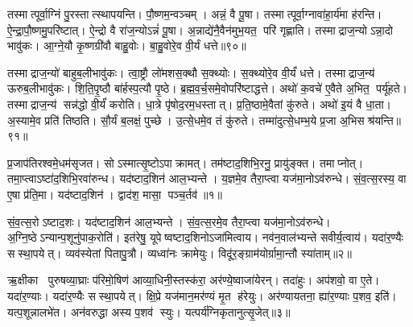 तस्मात्पूर्वा॒ग्निं पु॒रस्तात्स्थापयन्ति।
पौ॒ष्णम॒न्वञ्चम्।
अन्नं॒ वै पू॒षा।
तस्मात्पूर्वा॒ग्नावा॑हा॒र्य॑मा ह॑रन्ति।
ऐ॒न्द्रा॒पौ॒ष्णमु॒परि॑ष्टात्।
ऐ॒न्द्रो वै रा॑ज॒न्योऽन्नं॑ पू॒षा।
अ॒न्नाद्ये॑नै॒वैन॑मुभ॒यत॒ परि॑ गृह्णाति।
तस्माद्राज॒न्योऽन्ना॒दो भावु॑कः।
आ॒ग्ने॒यौ कृ॒ष्णग्री॑वौ बाहु॒वोः।
बा॒हु॒वोरे॒व वी॒र्यं धत्ते॥९०॥

तस्माद्राज॒न्यो॑ बाहुब॒लीभावु॑कः।
त्वा॒ष्ट्रौ लो॑मशस॒क्थौ स॒क्थ्योः।
स॒क्थ्योरे॒व वी॒र्यं॑ धत्ते।
तस्माद्राज॒न्य॑ ऊरुब॒लीभावु॑कः।
शि॒ति॒पृ॒ष्ठौ बा॑र्\mbox{}हस्प॒त्यौ पृ॒ष्ठे।
ब्र॒ह्म॒व॒र्च॒समे॒वोपरि॑ष्टाद्धत्ते।
अथो॑ क॒वचे॑ ए॒वैते अ॒भित॒ पर्यू॑हते।
तस्माद्राज॒न्य॑ सन्न॑द्धो वी॒र्यं॑ करोति।
धा॒त्रे पृ॑षोद॒रम॒धस्तात्।
प्र॒ति॒ष्ठामे॒वैतां कु॑रुते।
अथो॑ इ॒यं वै धा॒ता।
अ॒स्यामे॒व प्रति॑ तिष्ठति।
सौ॒र्यं ब॒लक्षं॒ पुच्छे।
उ॒त्से॒धमे॒व तं कु॑रुते।
तम्मा॑दुत्से॒धम्भ॒ये प्र॒जा अ॒भिसश्र॑यन्ति॥९१॥\anuvakamend[कु॒रु॒ते॒ ध॒त्ते॒ कु॒रु॒ते॒ पञ्च॑ च]




\clearpage
{}
\setcounter{anuvakam}{0}

प्र॒जाप॑तिरश्वमे॒धम॑सृजत।
सोऽस्मात्सृ॒ष्टोऽपाक्रामत्।
तम॑ष्टाद॒शिभि॒रनु॒ प्रायु॑ङ्क्त।
तमाप्नोत्।
तमा॒प्त्वाऽष्टा॑द॒शिभि॒रवा॑रुन्ध।
यद॑ष्टाद॒शिन॑ आल॒भ्यन्ते।
य॒ज्ञमे॒व तैरा॒प्त्वा यज॑मा॒नोऽव॑रुन्धे।
सं॒व॒त्स॒रस्य॒ वा ए॒षा प्र॑ति॒मा।
यद॑ष्टाद॒शिन॑।
द्वाद॑श॒ मासा॒ पञ्च॒र्तव॑॥१॥

सं॒व॒त्स॒रोऽष्टाद॒शः।
यद॑ष्टाद॒शिन॑ आल॒भ्यन्ते।
सं॒व॒त्स॒रमे॒व तैरा॒प्त्वा यज॑मा॒नोऽव॑रुन्धे।
अ॒ग्नि॒ष्ठेऽन्यान्प॒शूनु॑पाक॒रोति॑।
इत॑रेषु॒ यूपेष्वष्टाद॒शिनोऽजा॑मित्वाय।
नव॑न॒वाल॑भ्यन्ते सवीर्य॒त्वाय॑।
यदा॑र॒ण्यैः सस्था॒पयेत्।
व्यव॑स्येतां पितापु॒त्रौ।
व्यध्वा॑नः क्रामेयुः।
विदू॑र॒ङ्ग्राम॑योर्ग्रामा॒न्तौ स्या॑ताम्॥२॥

ऋ॒क्षीका पुरुषव्या॒घ्राः प॑रिमो॒षिण॑ आव्या॒धिनी॒स्तस्क॑रा॒ अर॑ण्ये॒ष्वाजा॑येरन्।
तदा॑हुः।
अप॑शवो॒ वा ए॒ते।
यदा॑र॒ण्याः।
यदा॑र॒ण्यैः सस्था॒पयेत्।
क्षि॒प्रे यज॑मान॒मर॑ण्यं मृ॒त ह॑रेयुः।
अर॑ण्यायतना॒ ह्या॑र॒ण्याः प॒शव॒ इति॑।
यत्प॒शून्नालभे॑त।
अन॑वरुद्धा अस्य प॒शव॑ स्युः।
यत्पर्य॑ग्निकृतानुत्सृ॒जेत्॥३॥

